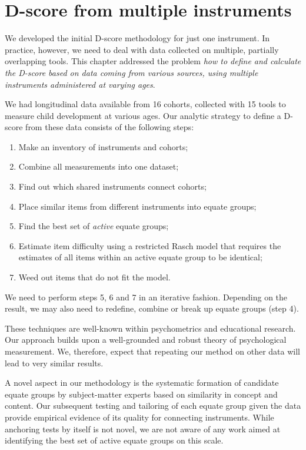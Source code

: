 \documentclass[
]{book}
\providecommand{\tightlist}{%
  \setlength{\itemsep}{0pt}\setlength{\parskip}{0pt}}
\begin{document}
\hypertarget{sec:multipleinstruments}{%
\section{D-score from multiple instruments}\label{sec:multipleinstruments}}

We developed the initial D-score methodology for just one instrument. In practice, however, we need to deal with data collected on multiple, partially overlapping tools. This chapter addressed the problem \emph{how to define and calculate the D-score based on data coming from various sources, using multiple instruments administered at varying ages}.

We had longitudinal data available from 16 cohorts, collected with 15 tools to measure child development at various ages. Our analytic strategy to define a D-score from these data consists of the following steps:

\begin{enumerate}
\def\labelenumi{\arabic{enumi}.}
\tightlist
\item
  Make an inventory of instruments and cohorts;
\item
  Combine all measurements into one dataset;
\item
  Find out which shared instruments connect cohorts;
\item
  Place similar items from different instruments into equate groups;
\item
  Find the best set of \emph{active} equate groups;
\item
  Estimate item difficulty using a restricted Rasch model that requires the estimates of all items within an active equate group to be identical;
\item
  Weed out items that do not fit the model.
\end{enumerate}

We need to perform steps 5, 6 and 7 in an iterative fashion. Depending on the result, we may also need to redefine, combine or break up equate groups (step 4).

These techniques are well-known within psychometrics and educational research. Our approach builds upon a well-grounded and robust theory of psychological measurement. We, therefore, expect that repeating our method on other data will lead to very similar results.

A novel aspect in our methodology is the systematic formation of candidate equate groups by subject-matter experts based on similarity in concept and content. Our subsequent testing and tailoring of each equate group given the data provide empirical evidence of its quality for connecting instruments. While anchoring tests by itself is not novel, we are not aware of any work aimed at identifying the best set of active equate groups on this scale.
\end{document}
